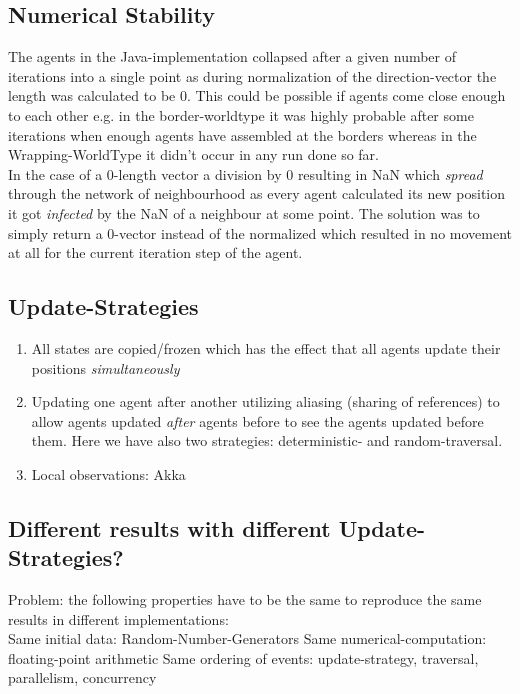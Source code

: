 \subsection{Numerical Stability}
The agents in the Java-implementation collapsed after a given number of iterations into a single point as during normalization of the direction-vector the length was calculated to be 0. This could be possible if agents come close enough to each other e.g. in the border-worldtype it was highly probable after some iterations when enough agents have assembled at the borders whereas in the Wrapping-WorldType it didn't occur in any run done so far. \\
In the case of a 0-length vector a division by 0  resulting in NaN which \textit{spread} through the network of neighbourhood as every agent calculated its new position it got \textit{infected} by the NaN of a neighbour at some point. The solution was to simply return a 0-vector instead of the normalized which resulted in no movement at all for the current iteration step of the agent. 


\subsection{Update-Strategies}
\begin{enumerate}
\item All states are copied/frozen which has the effect that all agents update their positions \textit{simultaneously}
\item Updating one agent after another utilizing aliasing (sharing of references) to allow agents updated \textit{after} agents before to see the agents updated before them. Here we have also two strategies: deterministic- and random-traversal.
\item Local observations: Akka
\end{enumerate}

\subsection{Different results with different Update-Strategies?}
Problem: the following properties have to be the same to reproduce the same results in different implementations: \\

Same initial data: Random-Number-Generators
Same numerical-computation: floating-point arithmetic
Same ordering of events: update-strategy, traversal, parallelism, concurrency

